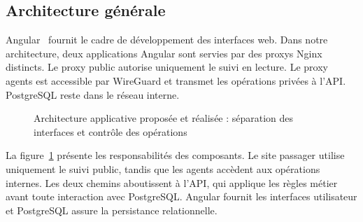 \documentclass[11pt]{extarticle}
\begin{document}
\subsection{Architecture générale}
Angular~\cite{angular} fournit le cadre de développement des interfaces web. Dans notre architecture, deux applications Angular sont servies par des proxys Nginx distincts. Le proxy public autorise uniquement le suivi en lecture. Le proxy agents est accessible par WireGuard et transmet les opérations privées à l'API. PostgreSQL reste dans le réseau interne.

\begin{figure}[H]\centering
{}
\caption{Architecture applicative proposée et réalisée : séparation des interfaces et contrôle des opérations}
\label{fig:architecture-applicative}
\end{figure}
La figure~\ref{fig:architecture-applicative} présente les responsabilités des composants. Le site passager utilise uniquement le suivi public, tandis que les agents accèdent aux opérations internes. Les deux chemins aboutissent à l'API, qui applique les règles métier avant toute interaction avec PostgreSQL. Angular fournit les interfaces utilisateur et PostgreSQL assure la persistance relationnelle.
\end{document}
